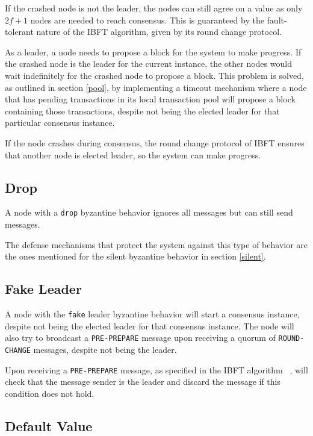 \documentclass[letterpaper,twocolumn,10pt]{article}
\begin{document}
If the crashed node is not the leader, the nodes can still agree on a value as only $2f + 1$ nodes are needed to reach consensus. This is guaranteed by the fault-tolerant nature of the IBFT algorithm, given by its round change protocol.

As a leader, a node needs to propose a block for the system to make progress. If the crashed node is the leader for the current instance, the other nodes would wait indefinitely for the crashed node to propose a block. This problem is solved, as outlined in section \ref{pool}, by implementing a timeout mechanism where a node that has pending transactions in its local transaction pool will propose a block containing those transactions, despite not being the elected leader for that particular consensus instance.

If the node crashes during consensus, the round change protocol of IBFT ensures that another node is elected leader, so the system can make progress.

\subsection{Drop}

A node with a \texttt{drop} byzantine behavior ignores all messages but can still send messages.

The defense mechanisms that protect the system against this type of behavior are the ones mentioned for the silent byzantine behavior in section \ref{silent}.

\subsection{Fake Leader}

A node with the \texttt{fake} leader byzantine behavior will start a consensus instance, despite not being the elected leader for that consensus instance. The node will also try to broadcast a \texttt{PRE-PREPARE} message upon receiving a quorum of \texttt{ROUND-CHANGE} messages, despite not being the leader.

Upon receiving a \texttt{PRE-PREPARE} message, as specified in the IBFT algorithm ~\cite{ibft}, will check that the message sender is the leader and discard the message if this condition does not hold.

\subsection{Default Value}
\end{document}
